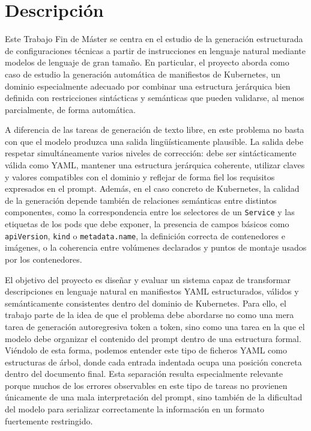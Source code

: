 \section{Descripción}

Este Trabajo Fin de Máster se centra en el estudio de la generación estructurada de configuraciones técnicas a partir de instrucciones en lenguaje natural mediante modelos de lenguaje de gran tamaño. En particular, el proyecto aborda como caso de 
estudio la generación automática de manifiestos de Kubernetes, un dominio especialmente adecuado por combinar una estructura jerárquica bien definida con restricciones sintácticas y semánticas que pueden validarse, al menos parcialmente, de forma automática.

A diferencia de las tareas de generación de texto libre, en este problema no basta con que el modelo produzca una salida lingüísticamente plausible. La salida debe respetar simultáneamente varios niveles de corrección: debe ser sintácticamente 
válida como YAML, mantener una estructura jerárquica coherente, utilizar claves y valores compatibles con el dominio y reflejar de forma fiel los requisitos expresados en el prompt. Además, en el caso concreto de Kubernetes, la calidad de la generación 
depende también de relaciones semánticas entre distintos componentes, como la correspondencia entre los selectores de un \texttt{Service} y las etiquetas de los pods que debe exponer, la presencia de campos básicos como \texttt{apiVersion}, \texttt{kind} 
o \texttt{metadata.name}, la definición correcta de contenedores e imágenes, o la coherencia entre volúmenes declarados y puntos de montaje usados por los contenedores.

El objetivo del proyecto es diseñar y evaluar un sistema capaz de transformar descripciones en lenguaje natural en manifiestos YAML estructurados, válidos y semánticamente consistentes dentro del dominio de Kubernetes. Para ello, el trabajo parte de la 
idea de que el problema debe abordarse no como una mera tarea de generación autoregresiva token a token, sino como una tarea en la que el modelo debe organizar el contenido del prompt dentro de una estructura formal. Viéndolo de esta forma, podemos 
entender este tipo de ficheros YAML como estructuras de árbol, donde cada entrada indentada ocupa una posición concreta dentro del documento final. Esta separación resulta especialmente relevante porque muchos de los errores observables en este tipo 
de tareas no provienen únicamente de una mala interpretación del prompt, sino también de la dificultad del modelo para serializar correctamente la información en un formato fuertemente restringido.

